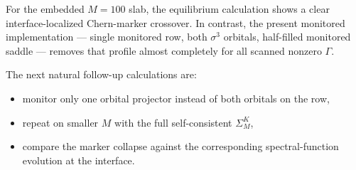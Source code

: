 \documentclass[11pt]{article}
\begin{document}
For the embedded \(M=100\) slab, the equilibrium calculation shows a clear
interface-localized Chern-marker crossover.  In contrast, the present monitored
implementation --- single monitored row, both \(\sigma^3\) orbitals, half-filled
monitored saddle --- removes that profile almost completely for all scanned
nonzero \(\Gamma\).

The next natural follow-up calculations are:
\begin{itemize}
\item monitor only one orbital projector instead of both orbitals on the row,
\item repeat on smaller \(M\) with the full self-consistent \(\Sigma_M^K\),
\item compare the marker collapse against the corresponding spectral-function
  evolution at the interface.
\end{itemize}
\end{document}
